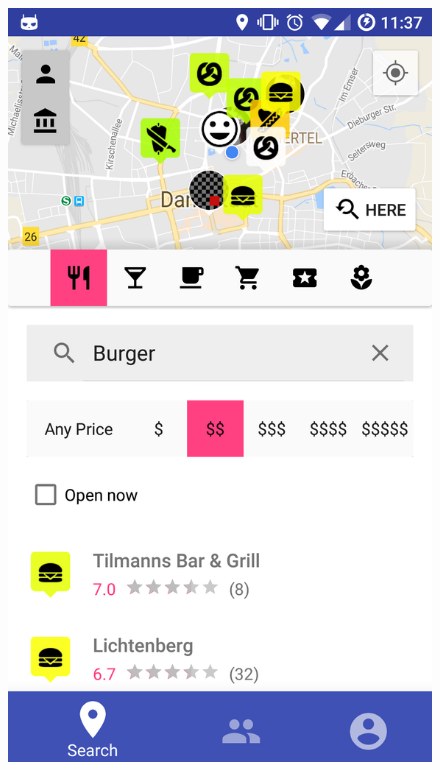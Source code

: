 \documentclass[11pt, accentcolor=tud1c]{tudreport}
\begin{document}
\begin{figure}[h]
\begin{minipage}{.3\textwidth}
  \includegraphics[width=.8\linewidth]{./res/search.png}
  \label{fig:search_view}
\end{minipage}
\begin{minipage}{.3\textwidth}
  \centering

\end{minipage}
\end{figure}
\end{document}

